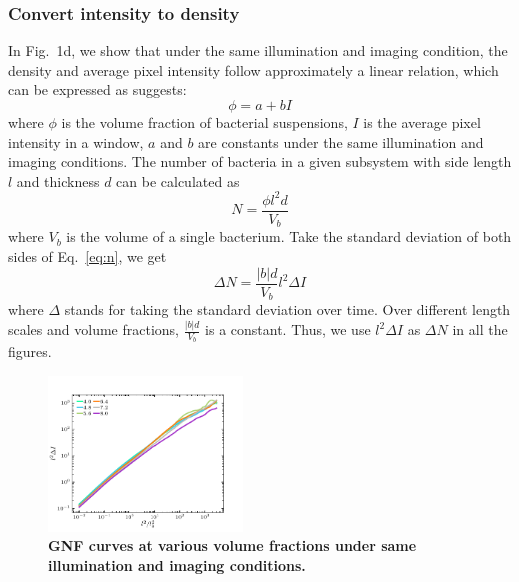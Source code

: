 \documentclass[twocolumn,aps,prx,amsmath,amssymb,longbibliography]{revtex4-2}
\begin{document}
\subsubsection{Convert intensity to density}
In Fig.~1d, we show that under the same illumination and imaging condition, the density and average pixel intensity follow approximately a linear relation, which can be expressed as suggests:
\begin{equation}
  \label{eq:phi-I-relation}
  \phi = a + bI
\end{equation}
where $\phi$ is the volume fraction of bacterial suspensions, $I$ is the average pixel intensity in a window, $a$ and $b$ are constants under the same illumination and imaging conditions. The number of bacteria in a given subsystem with side length $l$ and thickness $d$ can be calculated as
\begin{equation}
  \label{eq:n}
  N = \frac{\phi l^2d}{V_b}
\end{equation}
where $V_b$ is the volume of a single bacterium. Take the standard deviation of both sides of Eq.~\ref{eq:n}, we get
\begin{equation}
  \Delta N = \frac{|b|d}{V_b} l^2\Delta I
\end{equation}
where $\Delta$ stands for taking the standard deviation over time. Over different length scales and volume fractions, $\frac{|b|d}{V_b}$ is a constant. Thus, we use $l^2\Delta I$ as $\Delta N$ in all the figures.


\begin{figure}[t]
	\begin{center}
		\includegraphics[width=0.46\textwidth]{Figures/GNF-normalization/same-illumination.pdf}
		\caption[Density autocorrelation]
		{
			\textbf{GNF curves at various volume fractions under same illumination and imaging conditions.}
		}
		\label{fig:same-conditions}
	\end{center}
\end{figure}

\end{document}
